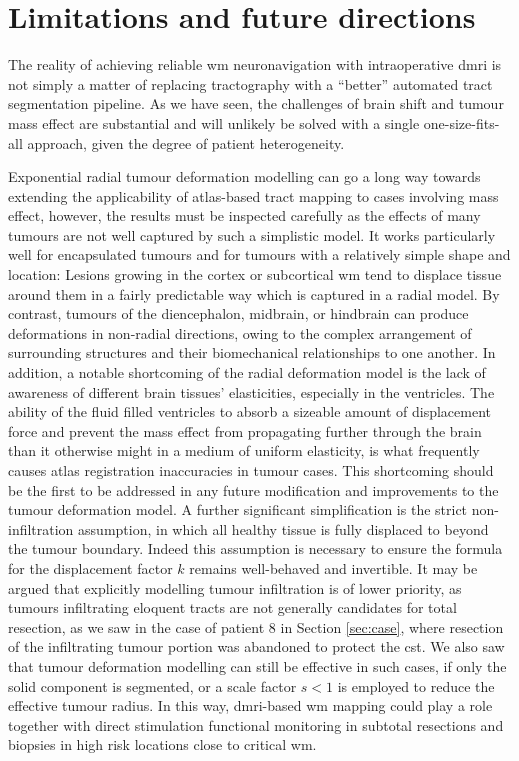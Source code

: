 \section{Limitations and future directions}\label{sec:future}

The reality of achieving reliable \gls{wm} neuronavigation with intraoperative \gls{dmri} is not simply a matter of replacing tractography with a ``better'' automated tract segmentation pipeline.
As we have seen, the challenges of brain shift and tumour mass effect are substantial and will unlikely be solved with a single one-size-fits-all approach, given the degree of patient heterogeneity.

Exponential radial tumour deformation modelling can go a long way towards extending the applicability of atlas-based tract mapping to cases involving mass effect, however, the results must be inspected carefully as the effects of many tumours are not well captured by such a simplistic model.
It works particularly well for encapsulated tumours and for tumours with a relatively simple shape and location:
Lesions growing in the cortex or subcortical \gls{wm} tend to displace tissue around them in a fairly predictable way which is captured in a radial model.
By contrast, tumours of the diencephalon, midbrain, or hindbrain can produce deformations in non-radial directions, owing to the complex arrangement of surrounding structures and their biomechanical relationships to one another.
In addition, a notable shortcoming of the radial deformation model is the lack of awareness of different brain tissues' elasticities, especially in the ventricles.
The ability of the fluid filled ventricles to absorb a sizeable amount of displacement force and prevent the mass effect from propagating further through the brain than it otherwise might in a medium of uniform elasticity, is what frequently causes atlas registration inaccuracies in tumour cases.
This shortcoming should be the first to be addressed in any future modification and improvements to the tumour deformation model.
A further significant simplification is the strict non-infiltration assumption, in which all healthy tissue is fully displaced to beyond the tumour boundary.
Indeed this assumption is necessary to ensure the formula for the displacement factor $k$ remains well-behaved and invertible.
It may be argued that explicitly modelling tumour infiltration is of lower priority, as tumours infiltrating eloquent tracts are not generally candidates for total resection, as we saw in the case of patient 8 in Section \ref{sec:case}, where resection of the infiltrating tumour portion was abandoned to protect the \gls{cst}.
We also saw that tumour deformation modelling can still be effective in such cases, if only the solid component is segmented, or a scale factor $s<1$ is employed to reduce the effective tumour radius.
In this way, \gls{dmri}-based \gls{wm} mapping could play a role together with direct stimulation functional monitoring in subtotal resections and biopsies in high risk locations close to critical \gls{wm}.

